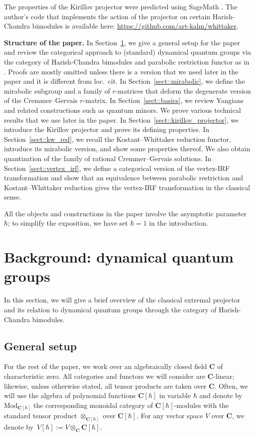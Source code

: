 \documentclass[10pt,a4paper]{article}
\numberwithin{equation}{section}
\newcommand{\C}{\mathbf{C}}
\newcommand{\Mod}[1]{{\mathrm{Mod}}_{#1}}
\begin{document}
	The properties of the Kirillov projector were predicted using SageMath \cite{SageMath}. The author's code that implements the action of the projector on certain Harish-Chandra bimodules is available here: \url{https://github.com/art-kalm/whittaker}.
	
	
{\bf Structure of the paper.} In Section~\ref{sect::dynamical_quantum_groups}, we give a general setup for the paper and review the categorical approach to (standard) dynamical quantum groups via the category of Harish-Chandra bimodules and parabolic restriction functor as in \cite{KalmykovSafronov}. Proofs are mostly omitted unless there is a version that we need later in the paper and it is different from loc.\ cit. In Section~\ref{sect::mirabolic}, we define the mirabolic subgroup and a family of $r$-matrices that deform the degenerate version of the Cremmer--Gervais $r$-matrix. In Section~\ref{sect::basics}, we review Yangians and related constructions such as quantum minors. We prove various technical results that we use later in the paper. In Section~\ref{sect::kirillov_projector}, we introduce the Kirillov projector and prove its defining properties. In Section~\ref{sect::kw_red}, we recall the Kostant--Whittaker reduction functor, introduce its mirabolic version, and show some properties thereof. We also obtain quantization of the family of rational Cremmer--Gervais solutions. In Section~\ref{sect::vertex_irf}, we define a categorical version of the vertex-IRF transformation and show that an equivalence between parabolic restriction and Kostant--Whittaker reduction gives the vertex-IRF transformation in the classical sense.
	
	All the objects and constructions in the paper involve the asymptotic parameter $\hbar$; to simplify the exposition, we have set $\hbar=1$ in the introduction.
	
	
	
	\section{Background: dynamical quantum groups}
	\label{sect::dynamical_quantum_groups}
	
	\renewcommand{\theequation}{\arabic{section}.\arabic{equation}}
	
	In this section, we will give a brief overview of the classical extremal projector and its relation to dynamical quantum groups through the category of Harish-Chandra bimodules.
	
	\subsection{General setup}
	\label{subsect::general_setup}
	For the rest of the paper, we work over an algebraically closed field $\C$ of characteristic zero. All categories and functors we will consider are $\C$-linear; likewise, unless otherwise stated, all tensor products are taken over $\C$. Often, we will use the algebra of polynomial functions $\C[\hbar]$ in variable $\hbar$ and denote by $\Mod{\C[\hbar]}$ the corresponding monoidal category of $\C[\hbar]$-modules with the standard tensor product $\otimes_{\C[\hbar]}$ over $\C[\hbar]$. For any vector space $V$ over $\C$, we denote by~${V[\hbar]:= V \otimes_{\C} \C[\hbar]}$.
	
\end{document}
